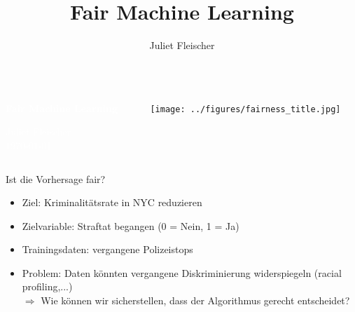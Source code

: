 \documentclass[aspectratio=169]{beamer}
\title{Fair Machine Learning}
\author{Juliet Fleischer} %
\institute[LMU]{LMU} %
{

}
\begin{document}
{
\begin{frame}
\begin{columns}
	\begin{column}{0.4\textwidth}
		\vspace{2.5cm}
		
		\textbf{\textcolor{white}{\Large Fair Machine Learning}}
		\vspace{1cm}
		
		\textcolor{white}{\footnotesize Juliet Fleischer \\
			\today}
	\end{column}
	\begin{column}{0.49\textwidth}
		\vspace{3cm}
		\begin{center}
			\texttt{[image: ../figures/fairness\_title.jpg]}
		\end{center}
	\end{column}
\end{columns}
\end{frame}
}





\begin{frame}{Ist die Vorhersage fair?}
    \begin{itemize}
		\item<1-> Ziel: Kriminalitätsrate in NYC reduzieren
		\item<2-> Zielvariable: Straftat begangen  (0 = Nein, 1 = Ja)
        \item<3-> Trainingsdaten: vergangene Polizeistops
        \item<4-> Problem: Daten könnten vergangene Diskriminierung widerspiegeln (racial profiling,...) \\ $\Rightarrow$ Wie können wir sicherstellen, dass der Algorithmus gerecht entscheidet?
    \end{itemize}
\end{frame}
\end{document}
